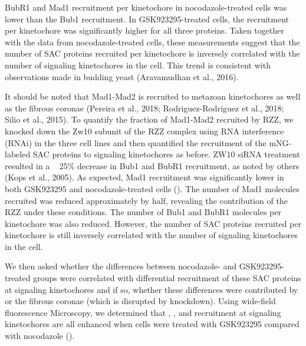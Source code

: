 BubR1 and Mad1 recruitment per kinetochore in nocodazole-treated cells was lower than the Bub1 recruitment. In GSK923295-treated cells, the recruitment per kinetochore was significantly higher for all three proteins. Taken together with the data from nocodazole-treated cells, these measurements suggest that the number of SAC proteins recruited per kinetochore is inversely correlated with the number of signaling kinetochores in the cell. This trend is consistent with observations made in budding yeast (Aravamudhan et al., 2016).

It should be noted that Mad1-Mad2 is recruited to metazoan kinetochores as well as the fibrous coronae (Pereira et al., 2018; Rodriguez-Rodriguez et al., 2018; Silio et al., 2015). To quantify the fraction of Mad1-Mad2 recruited by RZZ, we knocked down the Zw10 subunit of the RZZ complex using RNA interference (RNAi) in the three cell lines and then quantified the recruitment of the mNG-labeled SAC proteins to signaling kinetochores as before. ZW10 siRNA treatment resulted in a ~ 25\% decrease in Bub1 and BubR1 recruitment, as noted by others (Kops et al., 2005). As expected, Mad1 recruitment was significantly lower in both GSK923295 and nocodazole-treated cells (). The number of Mad1 molecules recruited was reduced approximately by half, revealing the contribution of the RZZ under these conditions. The number of Bub1 and BubR1 molecules per kinetochore was also reduced. However, the number of SAC proteins recruited per kinetochore is still inversely correlated with the number of signaling kinetochores in the cell.

We then asked whether the differences between nocodazole- and GSK923295-treated groups were correlated with differential recruitment of these SAC proteins at signaling kinetochores and if so, whether these differences were contributed by  or the fibrous coronae (which is disrupted by  knockdown). Using wide-field fluorescence Microscopy, we determined that , , and  recruitment at signaling kinetochores are all enhanced when cells were treated with GSK923295 compared with nocodazole ().

